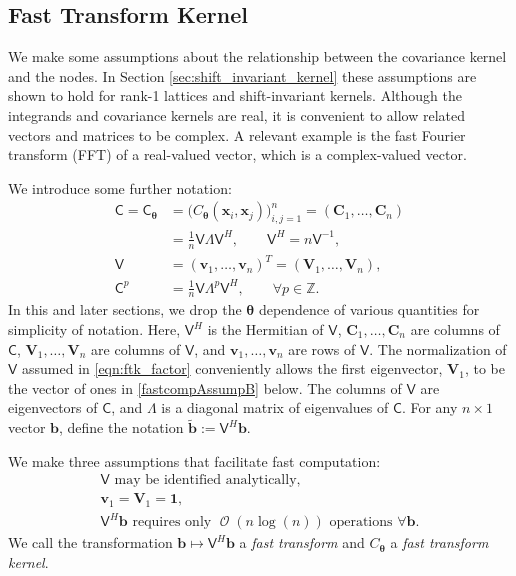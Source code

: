 \documentclass[twocolumn]{svjour3}          %
\DeclareMathOperator{\Order}{{\mathcal O}}
\newcommand{\bm}[1]{\boldsymbol{#1}}
\newcommand{\integers}{\mathbb{Z}}
\newcommand{\vtheta}{{\bm{\theta}}}
\newcommand{\vb}{\bm{b}}
\newcommand{\vC}{\bm{C}}
\newcommand{\vv}{\bm{v}}
\newcommand{\vV}{\bm{V}}
\newcommand{\vx}{\bm{x}}
\newcommand{\vone}{\bm{1}}
\newcommand{\mC}{\mathsf{C}}
\newcommand{\mLambda}{\mathsf{\Lambda}}
\newcommand{\mV}{\mathsf{V}}
\begin{document}
\subsection{Fast Transform Kernel}
We make some assumptions about the relationship between the covariance kernel and the nodes.  In Section \ref{sec:shift_invariant_kernel} these assumptions are shown to hold  for rank-1 lattices and shift-invariant kernels.  Although the integrands and covariance kernels are real, it is convenient to allow related vectors and matrices to be complex.  A relevant example is the fast Fourier transform (FFT) of a real-valued vector, which is a complex-valued vector. 

We introduce some further notation:
\begin{align}
\nonumber
\mC = \mC_\vtheta &= \Big(C_\vtheta(\vx_i,\vx_j)\Big)_{i,j=1}^n  = (\vC_1,\dots,\vC_n) 
\\
\label{eqn:ftk_factor}
&= \frac 1n \mV \mLambda \mV^H , 
\quad \quad \mV^H = n \mV^{-1}, \\
\nonumber
\mV &= (\vv_1,\ldots,\vv_n)^T = (\vV_1,\ldots,\vV_n), \\
\nonumber
\mC^p  &= \frac 1n \mV \mLambda^{p} \mV^H, \qquad \forall p \in \integers.
\end{align}
In this and later sections, we drop the $\vtheta$ dependence of various quantities for simplicity of notation.  Here, $\mV^H$ is the Hermitian of $\mV$, $\vC_1,\dots,\vC_n$ are columns of $\mC$,  $\vV_1,\dots,\vV_n$ are columns of $\mV$, and $\vv_1,\dots,\vv_n$ are rows of $\mV$.  The normalization of $\mV$ assumed in \eqref{eqn:ftk_factor} conveniently allows the first eigenvector, $\vV_1$, to be the vector of ones in \eqref{fastcompAssumpB} below.  The columns of $\mV$ are eigenvectors of $\mC$, and $\mLambda$ is a diagonal matrix of eigenvalues of $\mC$.
For any $n \times 1$ vector $\vb$, define the notation  $\widetilde{\vb} := \mV^H \vb$.

We make three assumptions that facilitate  fast computation:
\begin{subequations} \label{fastcompAssump}
	\begin{gather}
	\label{fastcompAssumpA}
	\mV \text{ may be identified analytically}, \\
	\label{fastcompAssumpB}
	\vv_1 = \vV_1 = \vone, \\
	\label{fastcompAssumpC}
	\mV^H \vb  \text{ requires only $\Order(n \log(n))$ operations } \forall \vb.
	\end{gather}
\end{subequations}
We call the transformation $\vb \mapsto \mV^H \vb$ a \emph{fast transform} and $C_\vtheta$ a \emph{fast transform kernel}.  
\end{document}
